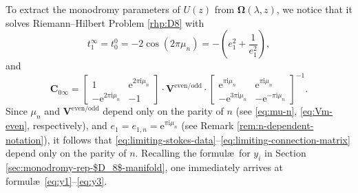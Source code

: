 \documentclass[pdftex]{sigma}
\numberwithin{equation}{section}
\newcommand{\ee}{\mathrm{e}}
\newcommand{\ii}{\mathrm{i}}
\begin{document}
To extract the monodromy parameters of $U(z)$ from $\mathbf{\Omega}(\lambda, z)$, we notice that it solves Riemann--Hilbert Problem \ref{rhp:D8} with
\begin{equation}\label{eq:limiting-stokes-data}
t_1^\infty = t_0^0 = -2\cos(2\pi \mu_n)= -\left(e_1^2+\frac{1}{e_1^2}\right),
\end{equation}
and
\begin{equation}
\mathbf{C}_{0\infty} = \begin{bmatrix} 1 & \ee^{2\pi \ii \mu_n} \\ -\ee^{2\pi \ii \mu_n} & -1 \end{bmatrix} \cdot \mathbf{V}^\mathrm{even/odd} \cdot \begin{bmatrix} \ee^{\pi \ii \mu_n}& \ee^{\pi \ii \mu_n}\\ - \ee^{3\pi \ii \mu_n} & - \ee^{-\pi \ii \mu_n} \end{bmatrix}^{-1}.
\label{eq:limiting-connection-matrix}
\end{equation}
Since $\mu_n$ and $\mathbf{V}^\mathrm{even/odd}$ depend only on the parity of $n$ (see \eqref{eq:mu-n}, \eqref{eq:Vm-even}, respectively), and ${e_1 = e_{1, n} = \ee^{\pi \ii \mu_n}}$ (see Remark \ref{rem:n-dependent-notation}), it follows that \eqref{eq:limiting-stokes-data}--\eqref{eq:limiting-connection-matrix} depend only on the parity of $n$. Recalling the formul\ae\ for $y_i$ in Section \ref{sec:monodromy-rep-$D_8$-manifold}, one immediately arrives at formul\ae\ \eqref{eq:y1}--\eqref{eq:y3}.
\end{document}
